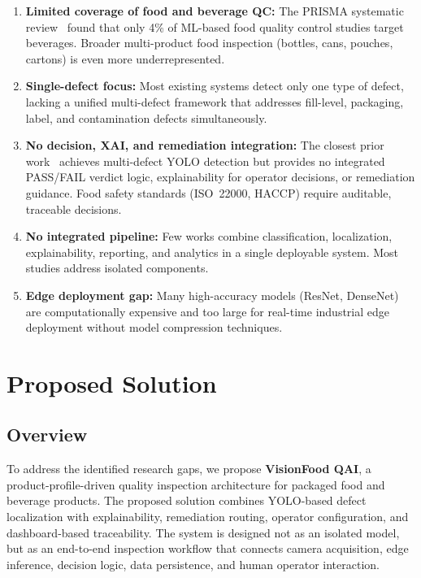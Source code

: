 \documentclass{ieeeaccess}
\begin{document}
\begin{enumerate}
    \item \textbf{Limited coverage of food and beverage QC:} The PRISMA systematic review~\cite{mlreview2025} found that only 4\% of ML-based food quality control studies target beverages. Broader multi-product food inspection (bottles, cans, pouches, cartons) is even more underrepresented.
    
    \item \textbf{Single-defect focus:} Most existing systems detect only one type of defect, lacking a unified multi-defect framework that addresses fill-level, packaging, label, and contamination defects simultaneously.
    
    \item \textbf{No decision, XAI, and remediation integration:} The closest prior work~\cite{liu2025foodpkg} achieves multi-defect YOLO detection but provides no integrated PASS/FAIL verdict logic, explainability for operator decisions, or remediation guidance. Food safety standards (ISO~22000, HACCP) require auditable, traceable decisions.
    
    \item \textbf{No integrated pipeline:} Few works combine classification, localization, explainability, reporting, and analytics in a single deployable system. Most studies address isolated components.
    
    \item \textbf{Edge deployment gap:} Many high-accuracy models (ResNet, DenseNet) are computationally expensive and too large for real-time industrial edge deployment without model compression techniques.
\end{enumerate}


\section{Proposed Solution}
\label{sec:proposed}

\subsection{Overview}
To address the identified research gaps, we propose \textbf{VisionFood QAI}, a product-profile-driven quality inspection architecture for packaged food and beverage products. The proposed solution combines YOLO-based defect localization with explainability, remediation routing, operator configuration, and dashboard-based traceability. The system is designed not as an isolated model, but as an end-to-end inspection workflow that connects camera acquisition, edge inference, decision logic, data persistence, and human operator interaction.
\end{document}
